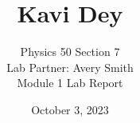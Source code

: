 \documentclass[letterpaper,12pt]{article}
\begin{document}
\title{\vspace{-2cm} Kavi Dey}
\author{\vspace{-0.4cm} Physics 50 Section 7 \\ Lab Partner: Avery Smith \\ Module 1 Lab Report}
\date{\vspace{-0.4cm} October 3, 2023}%
\maketitle



\end{document}
